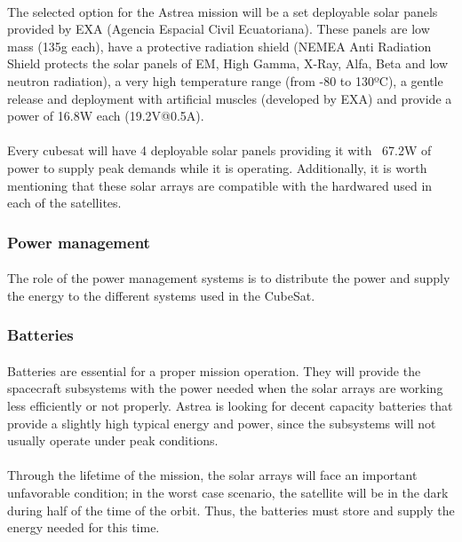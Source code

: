 \paragraph{}The selected option for the Astrea mission will be a set deployable solar panels provided by EXA (Agencia Espacial Civil Ecuatoriana). These panels are low mass (135g each), have a protective radiation shield (NEMEA Anti Radiation Shield protects the solar panels of EM, High Gamma, X-Ray, Alfa, Beta and low neutron radiation), a very high temperature range (from -80 to 130ºC), a gentle release and deployment with artificial muscles (developed by EXA) and provide a power of 16.8W each (19.2V@0.5A). \\
\paragraph{}Every cubesat will have 4 deployable solar panels providing it with ~67.2W of power to supply peak demands while it is operating. Additionally, it is worth mentioning that these solar arrays are compatible with the hardwared used in each of the satellites.

\subsubsection{Power management}

\paragraph{}The role of the power management systems is to distribute the power and supply the energy to the different systems used in the CubeSat.

\subsubsection{Batteries}

\paragraph{}	Batteries are essential for a proper mission operation. They will provide the spacecraft subsystems with the power needed when the solar arrays are working less efficiently or not properly. Astrea is looking for decent capacity batteries that provide a slightly high typical energy and power, since the subsystems will not usually operate under peak conditions.
\paragraph{}Through the lifetime of the mission, the solar arrays will face an important unfavorable condition; in the worst case scenario, the satellite will be in the dark during half of the time of the orbit. Thus, the batteries must store and supply the energy needed for this time.

